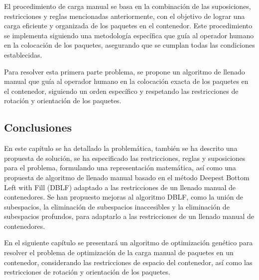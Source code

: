 El procedimiento de carga manual se basa en la combinación de las suposiciones, restricciones y reglas mencionadas anteriormente, con el objetivo de lograr una carga eficiente y organizada de los paquetes en el contenedor. Este procedimiento se implementa siguiendo una metodología específica que guía al operador humano en la colocación de los paquetes, asegurando que se cumplan todas las condiciones establecidas.

Para resolver esta primera parte problema, se propone un algoritmo de llenado manual que guía al operador humano en la colocación exacta de los paquetes en el contenedor, siguiendo un orden específico y respetando las restricciones de rotación y orientación de los paquetes.



\subsection{Conclusiones}

En este capítulo se ha detallado la problemática, también se ha descrito una propuesta de solución, se ha especificado las restricciones, reglas y suposiciones para el problema, formulando una representación matemática, así como una propuesta de algoritmo de llenado manual basado en el método Deepest Bottom Left with Fill (DBLF) adaptado a las restricciones de un llenado manual de contenedores. Se han propuesto mejoras al algoritmo DBLF, como la unión de subespacios, la eliminación de subespacios inaccesibles y la eliminación de subespacios profundos, para adaptarlo a las restricciones de un llenado manual de contenedores.

En el siguiente capítulo se presentará un algoritmo de optimización genético para resolver el problema de optimización de la carga manual de paquetes en un contenedor, considerando las restricciones de espacio del contenedor, así como las restricciones de rotación y orientación de los paquetes.
